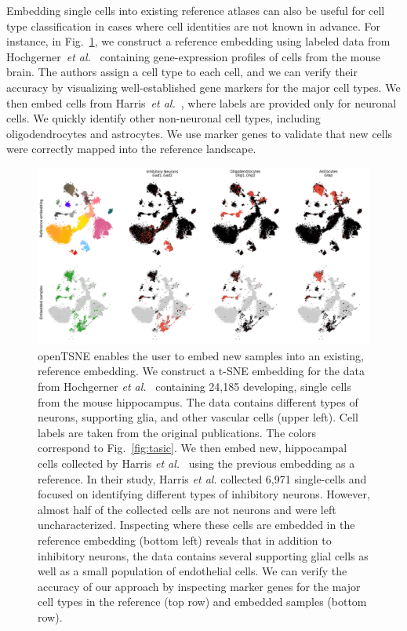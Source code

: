 \documentclass[twocolumn]{bmcart}
\begin{document}
Embedding single cells into existing reference atlases can also be useful for
cell type classification in cases where cell identities are not known in
advance. For instance, in Fig.~\ref{fig:transform}, we construct a reference
embedding using labeled data from Hochgerner~\textit{et
al.}~\cite{hochgerner2018conserved} containing gene-expression profiles of
cells from the mouse brain. The authors assign a cell type to each cell, and
we can verify their accuracy by visualizing well-established gene markers for the
major cell types. We then embed cells from Harris~\textit{et
al.}~\cite{harris2018classes}, where labels are provided only for neuronal
cells. We quickly identify other non-neuronal cell types, including
oligodendrocytes and astrocytes. We use marker genes to validate that new cells
were correctly mapped into the reference landscape.

\begin{figure}[htbp]
  \includegraphics[width=\textwidth]{transform_hochgerner}
  \caption{\label{fig:transform}openTSNE enables the user to embed new samples
	into an existing, reference embedding. We construct a t-SNE embedding
	for the data from Hochgerner \textit{et
	al.}~\cite{hochgerner2018conserved} containing 24,185 developing,
	single cells from the mouse hippocampus. The data contains different
	types of neurons, supporting glia, and other vascular cells (upper
	left). Cell labels are taken from the original publications. The
	colors correspond to Fig.~\ref{fig:tasic}. We then embed new,
	hippocampal cells collected by Harris \textit{et
	al.}~\cite{harris2018classes} using the previous embedding as a
	reference. In their study, Harris \textit{et al.} collected 6,971
	single-cells and focused on identifying different types of inhibitory
	neurons. However, almost half of the collected cells are not neurons
	and were left uncharacterized. Inspecting where these cells are
	embedded in the reference embedding (bottom left) reveals that in
	addition to inhibitory neurons, the data contains several supporting
	glial cells as well as a small population of endothelial cells. We can
	verify the accuracy of our approach by inspecting marker genes for the
	major cell types in the reference (top row) and embedded samples
	(bottom row).}
\end{figure}
\end{document}
